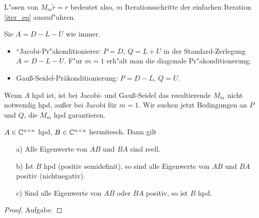 \medskip

\noindent L"osen von $M_m\tilde{r} = r$ bedeutet also, $m$ Iterationsschritte der einfachen
Iteration \eqref{iter_eq} auszuf"uhren.

\begin{bsp} Sie $A = D-L-U$ wie immer.
\begin{itemize}
\item ``Jacobi-Pr"akonditionierer: $P = D$, $Q = L+U$ in der Standard-Zerlegung $A = D-L-U$. F"ur $m=1$ erh"alt man die diagonale Pr"akonditionerung.
\item   Gau\ss{}-Seidel-Pr\"akonditionierung: $P = D-L$, $Q = U$.
\end{itemize}
\end{bsp}

Wenn $A$ hpd ist, ist bei Jacobi- und Gau\ss{}-Seidel das resultierende $M_m$ nicht notwendig hpd, au\ss{}er bei Jacobi f\"ur $m=1$. Wir suchen jetzt
Bedingungen an $P$ und $Q$, die $M_m$ hpd garantieren.

\begin{lem} \label{komm_lem} $A \in \mathbb{C}^{n\times n}$ hpd, $B \in
\mathbb{C}^{n \times n}$ hermitesch. Dann gilt\label{S466}
\begin{itemize}
\item[a)] Alle Eigenwerte von $AB$ und $BA$ sind reell.
\item[b)] Ist $B$ hpd (positiv semidefinit), so sind alle
Eigenwerte von $AB$ und $BA$ positiv (nichtnegativ).
\item[c)] Sind alle Eigenwerte von $AB$ oder $BA$ positiv, so ist $B$ hpd.
\end{itemize}
\end{lem}
\begin{proof} Aufgabe.
\end{proof}


